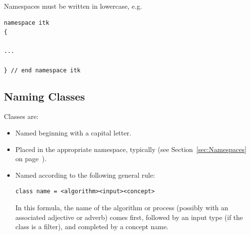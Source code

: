 Namespaces must be written in lowercase, e.g.

\small
\begin{verbatim}
namespace itk
{

...

} // end namespace itk
\end{verbatim}
\normalsize


\subsection{Naming Classes}%
\label{subsec:NamingClasses}

Classes are:
\begin{itemize}
\item Named beginning with a capital letter.
\item Placed in the appropriate namespace, typically  (see
Section~\ref{sec:Namespaces} on page~\pageref{sec:Namespaces}).
\item Named according to the following general rule:

\small
\begin{verbatim}
class name = <algorithm><input><concept>
\end{verbatim}
\normalsize

In this formula, the name of the algorithm or process (possibly with an
associated adjective or adverb) comes first, followed by an input type (if the
class is a filter), and completed by a concept name.
\end{itemize}

